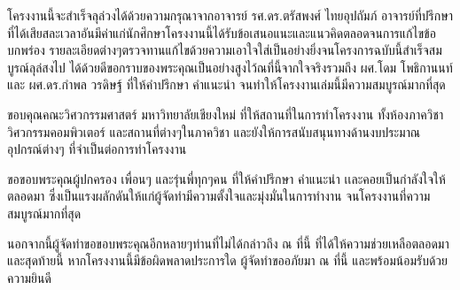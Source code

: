 \begin{acknowledgments}
\enskip \enskip \enskip \enskip \enskip โครงงานนี้จะสำเร็จลุล่วงได้ด้วยความกรุณาจากอาจารย์ รศ.ดร.ตรัสพงศ์ ไทยอุปถัมภ์     อาจารย์ที่ปรึกษาที่ได้เสียสละเวลาอันมีค่าแก่นักศึกษาโครงงานนี้ได้รับข้อเสนอแนะและแนวคิดตลอดจนการแก้ไขข้อบกพร่อง รายละเอียดต่างๆตรวจทานแก้ไขด้วยความเอาใจใส่เป็นอย่างยิ่งจนโครงการฉบับนี้สำเร็จสมบูรณ์ลุล่สงไป ได้ด้วยดีขอกราบของพระคุณเป็นอย่างสูงไว้ณที่นี้จากใจจริงรวมถึง ผศ.โดม โพธิกานนท์ และ ผศ.ดร.กำพล วรดิษฐ์ ที่ให้คําปรึกษา คำแนะนำ จนทําให้โครงงานเล่มนี้มีความสมบูรณ์มากที่สุด

\enskip \enskip ขอบคุณคณะวิศวกรรมศาสตร์ มหาวิทยาลัยเชียงใหม่ ที่ให้สถานที่ในการทําโครงงาน ทั้งห้องภาควิชาวิศวกรรมคอมพิวเตอร์ และสถานที่ต่างๆในภาควิชา และยังให้การสนับสนุนทางด้านงบประมาณ อุปกรณ์ต่างๆ ที่จำเป็นต่อการทำโครงงาน

\enskip \enskip ขอขอบพระคุณผู้ปกครอง เพื่อนๆ และรุ่นพี่ทุกๆคน ที่ให้คำปรึกษา คำแนะนำ เเละคอยเป็นกำลังใจให้ตลอดมา ซึ่งเป็นแรงผลักดันให้แก่ผู้จัดทํามีความตั้งใจและมุ่งมั่นในการทำงาน จนโครงงานที่ความสมบูรณ์มากที่สุด 

\enskip \enskip นอกจากนี้ผู้จัดทําขอขอบพระคุณอีกหลายๆท่านที่ไม่ได้กล่าวถึง ณ ที่นี้ ที่ได้ให้ความช่วยเหลือตลอดมา และสุดท้ายนี้ หากโครงงานนี้มีข้อผิดพลาดประการใด ผู้จัดทําขออภัยมา ณ ที่นี้ และพร้อมน้อมรับด้วยความยินดี



\end{acknowledgments}%
\fi %

\contentspage

\ifproject
\figurelistpage

\tablelistpage
\fi %



